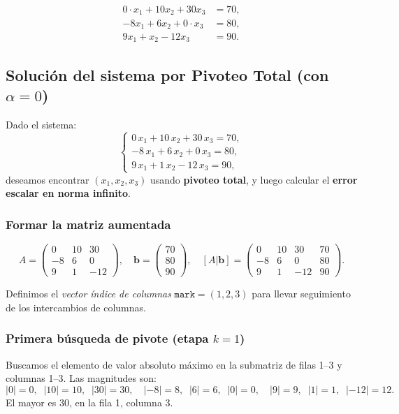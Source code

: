 \begin{align*}
  0\cdot x_1 + 10x_2 + 30x_3 &= 70,\\
   -8x_1 + 6x_2 + 0\cdot x_3 &= 80,\\
   9x_1 + x_2 - 12x_3 &= 90.
\end{align*}

\subsection{Solución del sistema por Pivoteo Total (con \(\alpha = 0\))}

Dado el sistema:
\[
\begin{cases}
0\,x_1 + 10\,x_2 + 30\,x_3 = 70,\\
-8\,x_1 + 6\,x_2 + 0\,x_3 = 80,\\
9\,x_1 + 1\,x_2 - 12\,x_3 = 90,
\end{cases}
\]
deseamos encontrar \((x_1,x_2,x_3)\) usando \textbf{pivoteo total}, y luego calcular el \textbf{error escalar en norma infinito}.

\subsubsection{Formar la matriz aumentada}

\[
A =
\begin{pmatrix}
0 & 10 & 30\\
-8 & 6 & 0\\
9 & 1 & -12
\end{pmatrix},
\quad
\mathbf{b}=
\begin{pmatrix}
70\\
80\\
90
\end{pmatrix},
\quad
[A|\mathbf{b}]=
\begin{pmatrix}
0 & 10 & 30 & 70\\
-8 & 6 & 0 & 80\\
9 & 1 & -12 & 90
\end{pmatrix}.
\]

Definimos el \emph{vector índice de columnas} \(\texttt{mark} = (1,2,3)\) para llevar seguimiento de los intercambios de columnas.

\subsubsection{Primera búsqueda de pivote (etapa \(k=1\))}

Buscamos el elemento de valor absoluto máximo en la submatriz de filas 1--3 y columnas 1--3.  
Las magnitudes son:
\[
|0|=0,\;\;|10|=10,\;\;|30|=30,\quad
|{-8}|=8,\;\;|6|=6,\;\;|0|=0,\quad
|9|=9,\;\;|1|=1,\;\;|{-12}|=12.
\]
El mayor es \(30\), en la fila 1, columna 3.

